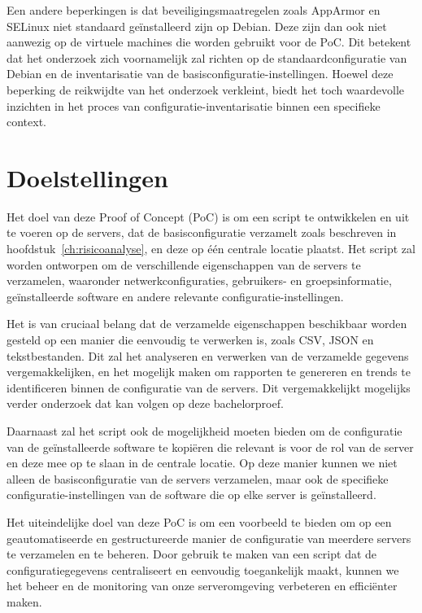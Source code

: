 Een andere beperkingen is dat beveiligingsmaatregelen zoals AppArmor en SELinux niet standaard ge\"installeerd zijn op Debian.
Deze zijn dan ook niet aanwezig op de virtuele machines die worden gebruikt voor de PoC.
Dit betekent dat het onderzoek zich voornamelijk zal richten op de standaardconfiguratie van Debian en de inventarisatie van de basisconfiguratie-instellingen.
Hoewel deze beperking de reikwijdte van het onderzoek verkleint, biedt het toch waardevolle inzichten in het proces van configuratie-inventarisatie binnen een specifieke context.

\section{Doelstellingen}
\label{poc_doelstellingen}

Het doel van deze Proof of Concept (PoC) is om een script te ontwikkelen en uit te voeren op de servers, dat de basisconfiguratie verzamelt zoals beschreven in hoofdstuk~\ref{ch:risicoanalyse}, en deze op één centrale locatie plaatst.
Het script zal worden ontworpen om de verschillende eigenschappen van de servers te verzamelen, waaronder netwerkconfiguraties, gebruikers- en groepsinformatie, ge\"installeerde software en andere relevante configuratie-instellingen.

Het is van cruciaal belang dat de verzamelde eigenschappen beschikbaar worden gesteld op een manier die eenvoudig te verwerken is, zoals CSV, JSON en tekstbestanden.
Dit zal het analyseren en verwerken van de verzamelde gegevens vergemakkelijken, en het mogelijk maken om rapporten te genereren en trends te identificeren binnen de configuratie van de servers.
Dit vergemakkelijkt mogelijks verder onderzoek dat kan volgen op deze bachelorproef.

Daarnaast zal het script ook de mogelijkheid moeten bieden om de configuratie van de ge\"installeerde software te kopi\"eren die relevant is voor de rol van de server en deze mee op te slaan in de centrale locatie.
Op deze manier kunnen we niet alleen de basisconfiguratie van de servers verzamelen, maar ook de specifieke configuratie-instellingen van de software die op elke server is ge\"installeerd.

Het uiteindelijke doel van deze PoC is om een voorbeeld te bieden om op een geautomatiseerde en gestructureerde manier de configuratie van meerdere servers te verzamelen en te beheren.
Door gebruik te maken van een script dat de configuratiegegevens centraliseert en eenvoudig toegankelijk maakt, kunnen we het beheer en de monitoring van onze serveromgeving verbeteren en effici\"enter maken.

